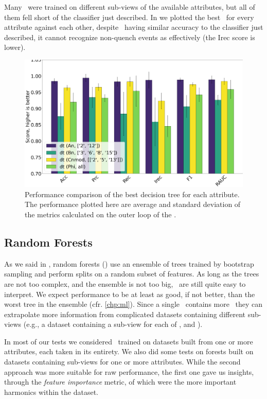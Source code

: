 Many \dts\ were trained on different sub-views of the available attributes, but all of them fell short
of the classifier just described. In  we plotted the best \dt\ for every
attribute against each other, despite \cnmod\ having similar accuracy to the classifier just
described, it cannot recognize non-quench events as effectively (the Irec score is lower).
\begin{figure}[!ht]
	\centering
	\includegraphics[width=0.7\linewidth]{img/best_dts.png}
	\caption{Performance comparison of the best decision tree for each attribute. The
		performance plotted here are average and standard deviation of the metrics calculated on the
		outer loop of the \ncv.} \label{fig:best-dts}
\end{figure}


\subsection{Random Forests}
\label{sec:qrp-rf}
As we said in , random forests (\rfs) use an ensemble of trees trained by bootstrap
sampling and perform splits on a random subset of features. As long as the trees are not too
complex, and the ensemble is not too big, \rfs\ are still quite easy to interpret. We expect
performance to be at least as good, if not better, than the worst tree in the ensemble (cfr.
\cref{chp:ml}). Since a single \rf\ contains more \dts\, they can extrapolate more information from
complicated datasets containing different sub-views (e.g., a dataset containing a sub-view for each
of \an, \bn and \cnmod).

In most of our tests we considered \rfs\ trained on datasets built from one or more attributes, each
taken in its entirety. We also did some tests on forests built on datasets containing sub-views for
one or more attributes. While the second approach was more suitable for raw performance, the first
one gave us insights, through the \emph{feature importance} metric, of which were the more important
harmonics within the dataset.

